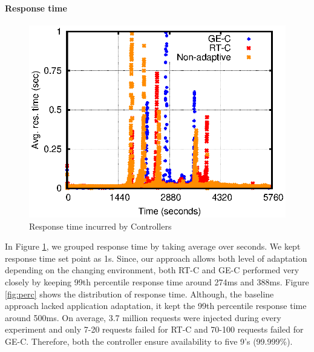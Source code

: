 
\paragraph*{\textbf{Response time}}
\begin{figure} [htb]
\centering
\includegraphics[scale=.8]{Graphs/responseTime.eps}
\caption{Response time incurred by Controllers}
\label{fig:rt}
\end{figure}
In Figure \ref{fig:rt}, we grouped response time by taking average over seconds. We kept response time set point as 1s. Since, our approach allows both level of adaptation depending on the changing environment, both RT-C and GE-C performed very closely by keeping 99th percentile response time around 274ms and 388ms. Figure \ref{fig:perc} shows the distribution of response time. Although, the baseline approach lacked application adaptation, it kept the 99th percentile response time around 500ms. On average, 3.7 million requests were injected during every experiment and only 7-20 requests failed for RT-C and 70-100 requests failed for GE-C. Therefore, both the controller ensure availability to five 9's (99.999\%).


